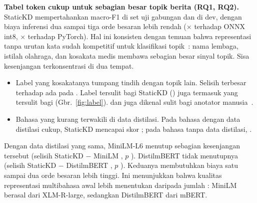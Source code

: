 \textbf{Tabel token cukup untuk sebagian besar topik berita (RQ1, RQ2).} StaticKD mempertahankan  macro-F1  di set uji gabungan dan  di dev, dengan biaya inferensi dua sampai tiga orde besaran lebih rendah ($\times$ terhadap ONNX int8, $\times$ terhadap PyTorch). Hal ini konsisten dengan temuan bahwa representasi tanpa urutan kata sudah kompetitif untuk klasifikasi topik~\cite{galke2022bow,iyyer2015dan}: nama lembaga, istilah olahraga, dan kosakata medis membawa sebagian besar sinyal topik. Sisa kesenjangan terkonsentrasi di dua tempat.
\begin{itemize}
  \item Label yang kosakatanya tumpang tindih dengan topik lain. Selisih terbesar terhadap  ada pada . Label tersulit bagi StaticKD () juga termasuk yang tersulit bagi  (Gbr.~\ref{fig:label}).  dan  juga dikenal sulit bagi anotator manusia~\cite{kuzman2025llm}.
  \item Bahasa yang kurang terwakili di data distilasi. Pada bahasa dengan data distilasi cukup, StaticKD mencapai  skor ; pada bahasa tanpa data distilasi, .
\end{itemize}
Dengan data distilasi yang sama, MiniLM-L6 menutup sebagian kesenjangan tersebut (selisih StaticKD $-$ MiniLM , $p$ ). DistilmBERT tidak menutupnya (selisih StaticKD $-$ DistilmBERT , $p$ ). Keduanya membutuhkan biaya satu sampai dua orde besaran lebih tinggi. Ini menunjukkan bahwa kualitas representasi multibahasa awal lebih menentukan daripada jumlah : MiniLM berasal dari XLM-R-large, sedangkan DistilmBERT dari mBERT.

